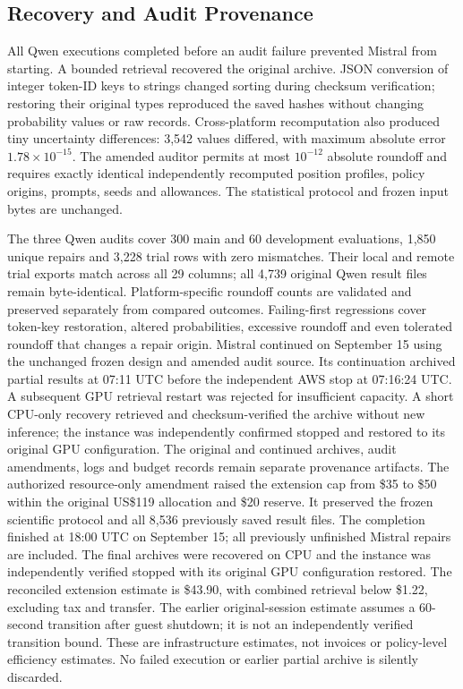 \documentclass{article}
\begin{document}
\clearpage

\subsection{Recovery and Audit Provenance}
All Qwen executions completed before an audit failure prevented Mistral
from starting. A bounded retrieval recovered the original archive. JSON
conversion of integer token-ID keys to strings changed sorting during
checksum verification; restoring their original types reproduced the
saved hashes without changing probability values or raw records.
Cross-platform recomputation also produced tiny uncertainty differences:
3,542 values differed, with maximum absolute error $1.78\times10^{-15}$.
The amended auditor permits at most $10^{-12}$ absolute roundoff and
requires exactly identical independently recomputed position profiles,
policy origins, prompts, seeds and allowances. The statistical protocol
and frozen input bytes are unchanged.

The three Qwen audits cover 300 main and 60 development evaluations,
1,850 unique repairs and 3,228 trial rows with zero mismatches. Their local
and remote trial exports match across all 29 columns; all 4,739 original
Qwen result files remain byte-identical. Platform-specific roundoff counts
are validated and preserved separately from compared outcomes. Failing-first
regressions cover token-key restoration, altered probabilities, excessive
roundoff and even tolerated roundoff that changes a repair origin.
Mistral continued on September 15 using the unchanged frozen design and
amended audit source. Its continuation archived partial results at
07:11 UTC before the independent AWS stop at 07:16:24 UTC. A subsequent
GPU retrieval restart was rejected for insufficient capacity. A short
CPU-only recovery retrieved and checksum-verified the archive without new
inference; the instance was independently confirmed stopped and restored
to its original GPU configuration. The original and continued archives,
audit amendments, logs and budget records remain separate provenance
artifacts. The authorized resource-only amendment raised the extension cap
from \$35 to \$50 within the original US\$119 allocation and \$20 reserve.
It preserved the frozen scientific protocol and all 8,536 previously saved
result files. The completion finished at 18:00 UTC on September 15;
all previously unfinished Mistral repairs are included. The final archives
were recovered on CPU and the instance was independently verified stopped
with its original GPU configuration restored. The reconciled extension
estimate is \$43.90, with combined retrieval below \$1.22, excluding
tax and transfer. The earlier original-session estimate assumes a
60-second transition after guest shutdown; it is not an independently
verified transition bound. These are infrastructure estimates, not invoices
or policy-level efficiency estimates. No failed execution or earlier partial
archive is silently discarded.
\end{document}
